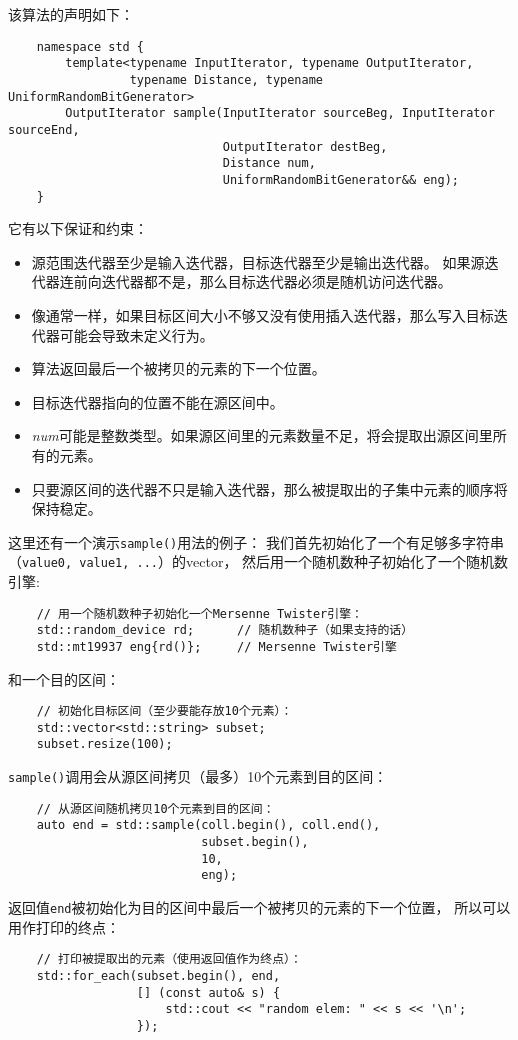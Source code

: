 该算法的声明如下：
\begin{lstlisting}
    namespace std {
        template<typename InputIterator, typename OutputIterator,
                 typename Distance, typename UniformRandomBitGenerator>
        OutputIterator sample(InputIterator sourceBeg, InputIterator sourceEnd,
                              OutputIterator destBeg,
                              Distance num,
                              UniformRandomBitGenerator&& eng);
    }
\end{lstlisting}
它有以下保证和约束：
\begin{itemize}
    \item 源范围迭代器至少是输入迭代器，目标迭代器至少是输出迭代器。
    如果源迭代器连前向迭代器都不是，那么目标迭代器必须是随机访问迭代器。
    \item 像通常一样，如果目标区间大小不够又没有使用插入迭代器，那么写入目标迭代器可能会导致未定义行为。
    \item 算法返回最后一个被拷贝的元素的下一个位置。
    \item 目标迭代器指向的位置不能在源区间中。
    \item \emph{num}可能是整数类型。如果源区间里的元素数量不足，将会提取出源区间里所有的元素。
    \item 只要源区间的迭代器不只是输入迭代器，那么被提取出的子集中元素的顺序将保持稳定。
\end{itemize}
这里还有一个演示\texttt{sample()}用法的例子：
我们首先初始化了一个有足够多字符串（\texttt{value0, value1, ...}）的vector，
然后用一个随机数种子初始化了一个随机数引擎:
\begin{lstlisting}
    // 用一个随机数种子初始化一个Mersenne Twister引擎：
    std::random_device rd;      // 随机数种子（如果支持的话）
    std::mt19937 eng{rd()};     // Mersenne Twister引擎
\end{lstlisting}
和一个目的区间：
\begin{lstlisting}
    // 初始化目标区间（至少要能存放10个元素）：
    std::vector<std::string> subset;
    subset.resize(100);
\end{lstlisting}
\texttt{sample()}调用会从源区间拷贝（最多）10个元素到目的区间：
\begin{lstlisting}
    // 从源区间随机拷贝10个元素到目的区间：
    auto end = std::sample(coll.begin(), coll.end(),
                           subset.begin(),
                           10,
                           eng);
\end{lstlisting}
返回值\texttt{end}被初始化为目的区间中最后一个被拷贝的元素的下一个位置，
所以可以用作打印的终点：
\begin{lstlisting}
    // 打印被提取出的元素（使用返回值作为终点）：
    std::for_each(subset.begin(), end,
                  [] (const auto& s) {
                      std::cout << "random elem: " << s << '\n';
                  });
\end{lstlisting}


